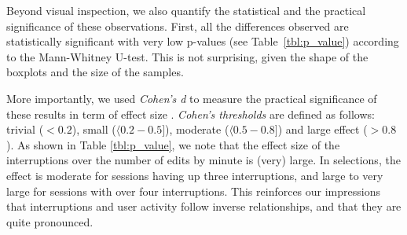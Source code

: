\documentclass[times]{smrauth}
\begin{document}
Beyond visual inspection, we also quantify the statistical and the practical significance of these observations. First, all the differences observed are statistically significant with very low p-values (see Table~\ref{tbl:p_value}) according to the Mann-Whitney U-test. This is not surprising, given the shape of the boxplots and the size of the samples.

More importantly, we used \textit{Cohen's d} to measure the practical significance of these results in term of effect size %
\cite{C94}. \textit{Cohen's thresholds} are defined as follows: trivial ($<0.2$), small  ($\langle 0.2 - 0.5 ]$), moderate ($\langle 0.5 - 0.8 ]$) and large effect ($> 0.8$). As shown in Table \ref{tbl:p_value}, we note that the effect size of the interruptions over the number of edits by minute is (very) large. In selections, the effect is moderate for sessions having up three interruptions, and large to very large for sessions with over four interruptions. This reinforces our impressions that interruptions and user activity follow inverse relationships, and that they are quite pronounced.

\end{document}
